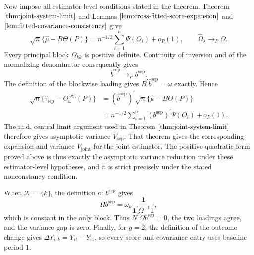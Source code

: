 Now impose all estimator-level conditions stated in the theorem. Theorem \(\ref{thm:joint-system-limit}\) and Lemmas \(\ref{lem:cross-fitted-score-expansion}\) and \(\ref{lem:fitted-covariance-consistency}\) give
\[
\sqrt n\{\widehat\mu-B\Theta(P)\}
=n^{-1/2}\sum_{i=1}^n\Psi(O_i)+o_P(1),
\qquad
\widehat\Omega_{\lambda}\to_P\Omega.
\]
Every principal block \(\Omega_{kk}\) is positive definite. Continuity of inversion and of the normalizing denominator consequently gives
\[
\widehat b^{\mathrm{sep}}
\to_P b^{\mathrm{sep}}.
\]
The definition of the blockwise loading gives \(B^{\prime}\widehat b^{\mathrm{sep}}=\omega\) exactly. Hence
\[
\begin{aligned}
\sqrt n\{\widehat\tau_{\mathrm{sep}}-\Theta_\omega^{\mathrm{agg}}(P)\}
&=(\widehat b^{\mathrm{sep}})^{\prime}
\sqrt n\{\widehat\mu-B\Theta(P)\}\\
&=n^{-1/2}\sum_{i=1}^n(b^{\mathrm{sep}})^{\prime}\Psi(O_i)+o_P(1).
\end{aligned}
\]
The i.i.d. central limit argument used in Theorem \(\ref{thm:joint-system-limit}\) therefore gives asymptotic variance \(V_{\mathrm{sep}}\). That theorem gives the corresponding expansion and variance \(V_{\mathrm{joint}}\) for the joint estimator. The positive quadratic form proved above is thus exactly the asymptotic variance reduction under these estimator-level hypotheses, and it is strict precisely under the stated nonconstancy condition.

When \(\mathcal K=\{k\}\), the definition of \(b^{\mathrm{sep}}\) gives
\[
\Omega b^{\mathrm{sep}}
=\omega_k\frac{\mathbf 1}{\mathbf 1^{\prime}\Omega^{-1}\mathbf 1},
\]
which is constant in the only block. Thus \(N^{\prime}\Omega b^{\mathrm{sep}}=0\), the two loadings agree, and the variance gap is zero. Finally, for \(g=2\), the definition of the outcome change gives \(\Delta Y_{i,k}=Y_{it}-Y_{i1}\), so every score and covariance entry uses baseline period \(1\).
